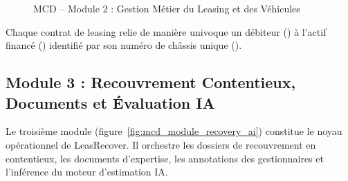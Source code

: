 \begin{figure}[H]
{%
}
\caption{MCD -- Module 2 : Gestion Métier du Leasing et des Véhicules}
\label{fig:mcd_module_leasing}
\end{figure}

Chaque contrat de leasing relie de manière univoque un débiteur () à l'actif financé () identifié par son numéro de châssis unique ().

\subsection{Module 3 : Recouvrement Contentieux, Documents et Évaluation IA}

Le troisième module (figure~\ref{fig:mcd_module_recovery_ai}) constitue le noyau opérationnel de LeasRecover. Il orchestre les dossiers de recouvrement en contentieux, les documents d'expertise, les annotations des gestionnaires et l'inférence du moteur d'estimation IA.

